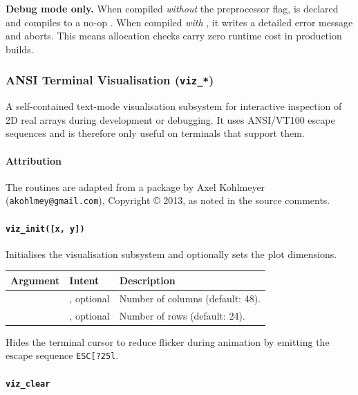 \textbf{Debug mode only.} When compiled \emph{without} the 
preprocessor flag,  is declared  and compiles
to a no-op . When compiled \emph{with} , it writes
a detailed error message and aborts. This means allocation checks carry zero
runtime cost in production builds.

\subsubsection{ANSI Terminal Visualisation (\texttt{viz\_*})}

A self-contained text-mode visualisation subsystem for interactive inspection
of 2D real arrays during development or debugging. It uses ANSI/VT100 escape
sequences and is therefore only useful on terminals that support them.

\paragraph{Attribution}

The  routines are adapted from a package by
Axel Kohlmeyer (\texttt{akohlmey@gmail.com}), Copyright \copyright{} 2013,
as noted in the source comments.

\paragraph{\texttt{viz\_init([x, y])}}

Initialises the visualisation subsystem and optionally sets the plot
dimensions.

\begin{longtable}{L{3cm} L{3cm} L{8cm}}
  \toprule
  \textbf{Argument} & \textbf{Intent} & \textbf{Description} \\
  \midrule
  \endhead
  \bottomrule
  \endfoot
   & , optional & Number of columns (default: 48). \\
   & , optional & Number of rows (default: 24). \\
\end{longtable}

Hides the terminal cursor to reduce flicker during animation by emitting
the escape sequence \texttt{ESC[?25l}.

\paragraph{\texttt{viz\_clear}}

